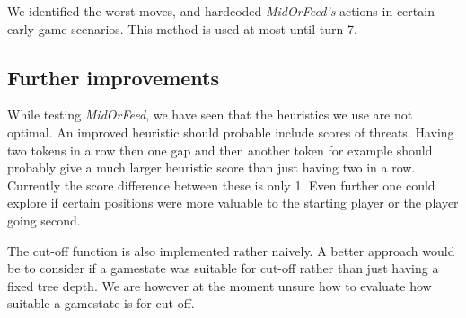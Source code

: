 We identified the worst moves, and hardcoded \textit{MidOrFeed's} actions in certain early game scenarios. This method is used at most until turn 7.

\subsection{Further improvements}
While testing \textit{MidOrFeed}, we have seen that the heuristics we use are not optimal. An improved heuristic should probable include scores of threats. Having two tokens in a row then one gap and then another token for example should probably give a much larger heuristic score than just having two in a row. Currently the score difference between these is only 1. Even further one could explore if certain positions were more valuable to the starting player or the player going second. 

The cut-off function is also implemented rather naively. A better approach would be to consider if a gamestate was suitable for cut-off rather than just having a fixed tree depth. We are however at the moment unsure how to evaluate how suitable a gamestate is for cut-off.